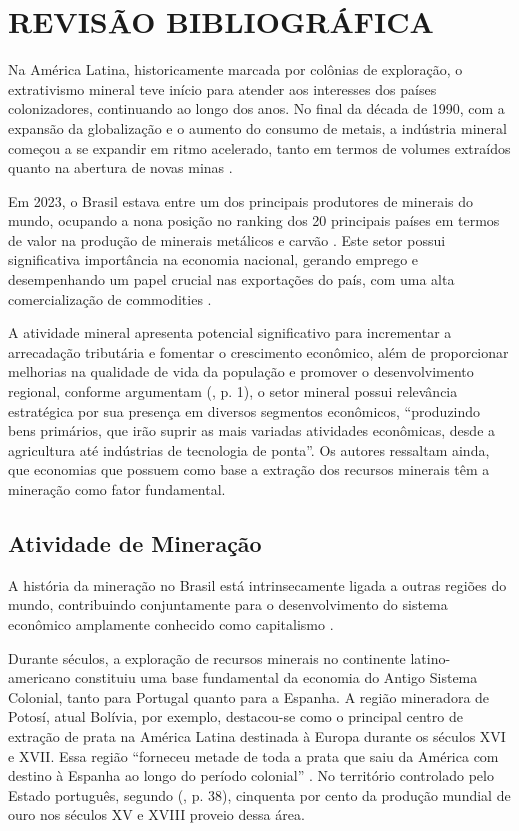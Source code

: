 \chapter{REVISÃO BIBLIOGRÁFICA}
\label{cap1Revisao}

Na América Latina, historicamente marcada por colônias de exploração, o extrativismo mineral teve início para atender aos interesses dos países colonizadores, continuando ao longo dos anos. No final da década de 1990, com a expansão da globalização e o aumento do consumo de metais, a indústria mineral começou a se expandir em ritmo acelerado, tanto em termos de volumes extraídos quanto na abertura de novas minas \cite{fernandes2016mineracao}.

Em 2023, o Brasil estava entre um dos principais produtores de minerais do mundo, ocupando a nona posição no ranking dos 20 principais países em termos de valor na produção de minerais metálicos e carvão \cite{wpr2024mineral}. Este setor possui significativa importância na economia nacional, gerando emprego e desempenhando um papel crucial nas exportações do país, com uma alta comercialização de commodities \cite{rbm2024mineracao}.

A atividade mineral apresenta potencial significativo para incrementar a arrecadação tributária e fomentar o crescimento econômico, além de proporcionar melhorias na qualidade de vida da população e promover o desenvolvimento regional, conforme argumentam \citeauthor{carvalho2012dependencia} (\citeyear{carvalho2012dependencia}, p. 1), o setor mineral possui relevância estratégica por sua presença em diversos segmentos econômicos, ``produzindo bens primários, que irão suprir as mais variadas atividades econômicas, desde a agricultura até indústrias de tecnologia de ponta''. Os autores ressaltam ainda, que
economias que possuem como base a extração dos recursos minerais têm a mineração como fator fundamental.

\section{Atividade de Mineração}
\label{sec:atividade_mineracao}

A história da mineração no Brasil está intrinsecamente ligada a outras regiões do mundo, contribuindo conjuntamente para o desenvolvimento do sistema econômico amplamente conhecido como capitalismo \cite[p. 5]{domingues2022historia}.

Durante séculos, a exploração de recursos minerais no continente latino-ameri\-cano constituiu uma base funda\-mental da economia do Antigo Sistema Colonial, tanto para Portugal quanto para a Espanha. A região minera\-dora de Potosí, atual Bolívia, por exemplo, destacou-se como o principal centro de extração de prata na América Latina destinada à Europa durante os séculos XVI e XVII. Essa região ``forneceu metade de toda a prata que saiu da América com destino à Espanha ao longo do período colonial'' \cite[p. 122]{araoz2020mineracao}. No território controlado pelo Estado português, segundo \citeauthor{figueiroa1997ciencias} (\citeyear{figueiroa1997ciencias}, p. 38), cinquenta por cento da produção mundial de ouro nos séculos XV e XVIII proveio dessa área.

